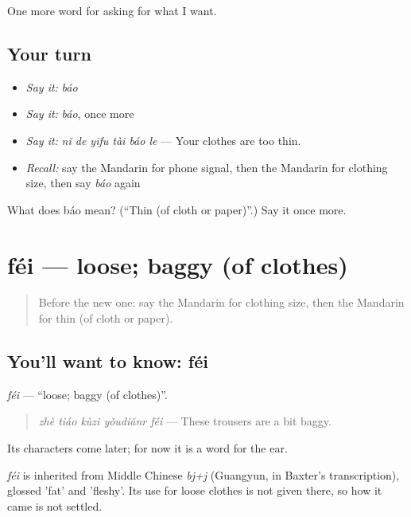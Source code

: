 \begin{grammarlens}[title={What you've built}]
One more word for asking for what I want.
\end{grammarlens}

\subsection*{Your turn}
\begin{itemize}
\raggedright
  \item \emph{Say it:} \emph{báo}
  \item \emph{Say it:} \emph{báo}, once more
  \item \emph{Say it:} \emph{nǐ de yīfu tài báo le} — Your clothes are too thin.
  \item \emph{Recall:} say the Mandarin for phone signal, then the Mandarin for clothing size, then say \emph{báo} again
\end{itemize}

\begin{tcolorbox}[breakable,colback=teal!4,colframe=teal!35!black,title={Before you move on}]
What does báo mean? (\textquotedblleft{}Thin (of cloth or paper)\textquotedblright{}.) Say it once more.
\end{tcolorbox}
\section[féi]{féi — loose; baggy (of clothes)}

\label{lesson:ZH-C199-fei}



\begin{quote}
Before the new one: say the Mandarin for clothing size, then the Mandarin for thin (of cloth or paper).
\end{quote}

\subsection*{You'll want to know: féi}
\emph{féi} — \textquotedblleft{}loose; baggy (of clothes)\textquotedblright{}.

\begin{quote}
\emph{zhè tiáo kùzi yǒudiǎnr féi} — These trousers are a bit baggy.
\end{quote}

Its characters come later; for now it is a word for the ear.

\begin{cousinweb}
\emph{féi} is inherited from Middle Chinese \emph{bj+j} (Guangyun, in Baxter's transcription), glossed 'fat' and 'fleshy'. Its use for loose clothes is not given there, so how it came is not settled.
\end{cousinweb}

